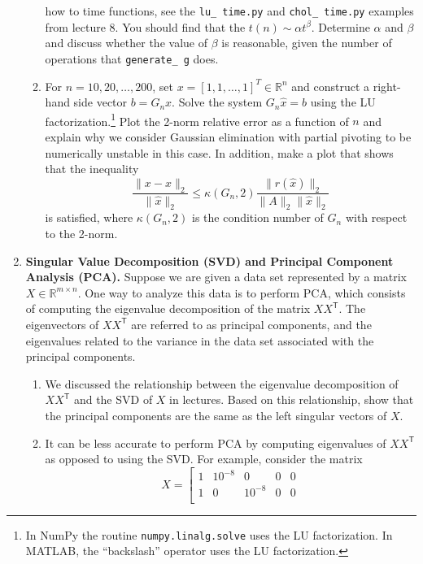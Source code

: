 \documentclass[11pt]{article}
\newcommand{\R}{\mathbb{R}}
\newcommand{\Trans}{\mathsf{T}}
\begin{document}
\begin{enumerate}
\begin{enumerate}
{	how to time functions, see the \texttt{lu\_\,time.py} and
	\texttt{chol\_\,time.py} examples from lecture 8.} You should find that
	the $t(n)\sim \alpha t^\beta$. Determine $\alpha$ and $\beta$ and
	discuss whether the value of $\beta$ is reasonable, given the number of
	operations that \texttt{generate\_\,g} does.
      \item For $n = 10, 20, \ldots, 200$, set $x = [1,1,\ldots,1]^T \in \R^n$ and
	construct a right-hand side vector $b= G_n x$. Solve the system
	$G_n \hat{x} = b$ using the LU factorization.\footnote{In NumPy
	the routine \texttt{numpy.linalg.solve} uses the LU factorization.
	In MATLAB, the ``backslash'' operator uses the LU factorization.}
	Plot the 2-norm relative error as a function of $n$ and explain why
	we consider Gaussian elimination with partial pivoting to be
	numerically unstable in this case. In addition, make a plot that
	shows that the inequality
	\begin{equation}
	  \frac{\|x - \hat x\|_2}{\|\hat x\|_2} \leq \kappa(G_n,2)\frac{\|r(\hat x)\|_2}{\|A\|_2\|\hat x\|_2}
	\end{equation}
	is satisfied, where $\kappa(G_n,2)$ is the condition number of $G_n$
	with respect to the 2-norm.
    \end{enumerate}
  \item {\bf Singular Value Decomposition (SVD) and Principal Component Analysis (PCA).} Suppose we are given a data set represented by a matrix $X \in \R^{m\times n}$. One way to analyze this data is to perform PCA, which consists of computing the eigenvalue decomposition of the matrix $XX^\Trans$. The eigenvectors of $XX^\Trans$ are referred to as principal components, and the eigenvalues related to the variance in the data set associated with the principal components.
    \begin{enumerate}
      \item We discussed the relationship between the eigenvalue decomposition
	of $XX^\Trans$ and the SVD of $X$ in lectures. Based on this
	relationship, show that the principal components are the same as the
	left singular vectors of $X$.
      \item It can be less accurate to perform PCA by computing eigenvalues of
	$XX^\Trans$ as opposed to using the SVD. For example, consider the
	matrix
	\begin{equation}
	  X =
	  \left[
	  \begin{array}{ccccc}
	    1 & 10^{-8} & 0 & 0 & 0 \\
	    1 & 0 & 10^{-8} & 0 & 0 \\

\end{array}
\end{equation}
\end{enumerate}
\end{enumerate}
\end{document}
